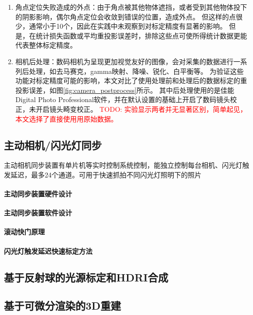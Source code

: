 \documentclass{scutmaster}
\newcommand{\TODO}[1]{\textcolor{red}{TODO: #1}}
\begin{document}
\begin{enumerate}
\item 角点定位失败造成的外点：由于角点被其他物体遮挡，或者受到其他物体投下的阴影影响，偶尔角点定位会收敛到错误的位置，造成外点。
但这样的点很少，通常小于10个，因此在实践中未观察到对标定精度有显著的影响。
但是，在统计损失函数或平均重投影误差时，排除这些点可使所得统计数据更能代表整体标定精度。

\item 相机后处理：数码相机为呈现更加视觉友好的图像，会对采集的数据进行一系列后处理，如去马赛克，gamma映射、降噪、锐化、白平衡等。
为验证这些功能对标定精度可能的影响，本文对比了使用处理前和处理后的数据标定的重投影误差，如图\ref{fig:camera_postprocess}所示。
其中后处理使用的是佳能Digital Photo Professional软件，并在默认设置的基础上开启了数码镜头校正，未开启镜头畸变校正。
\TODO{实验显示两者并无显著区别，简单起见，本文选择了直接使用用原始数据。}
\end{enumerate}

\subsection{主动相机/闪光灯同步}

主动相机同步装置有单片机等实时控制系统控制，能独立控制每台相机、闪光灯触发延迟，最多24个通道。可用于快速抓拍不同闪光灯照明下的照片

\paragraph{主动同步装置硬件设计}

\paragraph{主动同步装置软件设计}

\paragraph{滚动快门原理}

\paragraph{闪光灯触发延迟快速标定方法}

\subsection{基于反射球的光源标定和HDRI合成}

\subsection{基于可微分渲染的3D重建}
\end{document}
